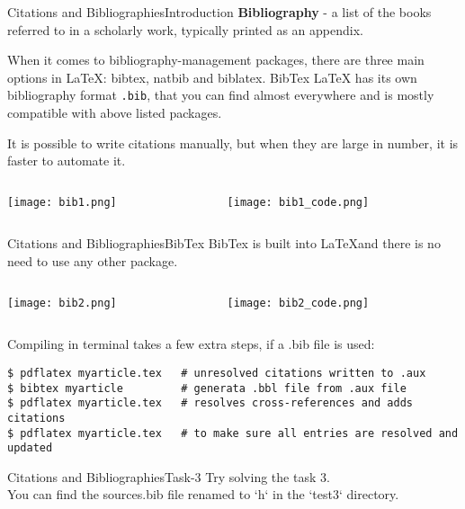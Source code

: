\begin{frame}{Citations and Bibliographies}{Introduction}
\textbf{Bibliography} - a list of the books referred to in a scholarly work,
typically printed as an appendix.  \\ \vspace{1em}

\footnotesize
When it comes to bibliography-management packages, there are three main options
in LaTeX: bibtex, natbib and biblatex. BibTex LaTeX has its own bibliography format
\texttt{.bib}, that you can find almost everywhere and is mostly compatible
with above listed packages.

It is possible to write citations manually, but when they are large in number,
it is faster to automate it. \vspace{2em}

\begin{columns}
    \begin{column}{0.4\textwidth}
        \texttt{[image: bib1.png]}
    \end{column}
    \begin{column}{0.6\textwidth}
        \texttt{[image: bib1\_code.png]}
    \end{column}
\end{columns}
\end{frame}


\begin{frame}[fragile]{Citations and Bibliographies}{BibTex}
\footnotesize
BibTex is built into \LaTeX and there is no need to use any other package.
\vspace{1em}

\begin{columns}
    \begin{column}{0.3\textwidth}
        \texttt{[image: bib2.png]}
    \end{column}
    \begin{column}{0.7\textwidth}
        \texttt{[image: bib2\_code.png]}
    \end{column}
\end{columns}

Compiling in terminal takes a few extra steps, if a .bib file is used:
\tiny
\begin{lstlisting}
$ pdflatex myarticle.tex   # unresolved citations written to .aux
$ bibtex myarticle         # generata .bbl file from .aux file
$ pdflatex myarticle.tex   # resolves cross-references and adds citations
$ pdflatex myarticle.tex   # to make sure all entries are resolved and updated
\end{lstlisting}

\end{frame}

\begin{frame}{Citations and Bibliographies}{Task-3}
Try solving the task 3. \\ \pause
You can find the sources.bib file renamed to `h` in the `test3`
directory.
\end{frame}

